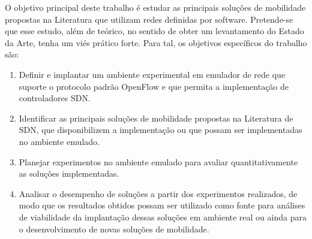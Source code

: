 \documentclass[	12pt, Times, openright, twoside, a4paper, english, brazil]{abntex2}
\begin{document}
O objetivo principal deste trabalho é estudar as principais soluções de mobilidade propostas na Literatura que utilizam redes definidas por software. Pretende-se que esse estudo, além de teórico, no sentido de obter um levantamento do Estado da Arte, tenha um viés prático forte. Para tal, os objetivos específicos do trabalho são:
\begin{enumerate}
    \item Definir e implantar um ambiente experimental em emulador de rede que suporte o protocolo padrão OpenFlow \cite{McKeown} e que permita a implementação de controladores SDN.
    \item Identificar as principais soluções de mobilidade propostas na Literatura de SDN, que disponibilizem a implementação ou que possam ser implementadas no ambiente emulado.
    \item Planejar experimentos no ambiente emulado para avaliar quantitativamente as soluções implementadas.
    \item Analisar o desempenho de soluções a partir dos experimentos realizados, de modo que os resultados obtidos possam ser utilizado como fonte para análises de viabilidade da implantação dessas soluções em ambiente real ou ainda para o desenvolvimento de novas soluções de mobilidade. 
\end{enumerate}
\end{document}
